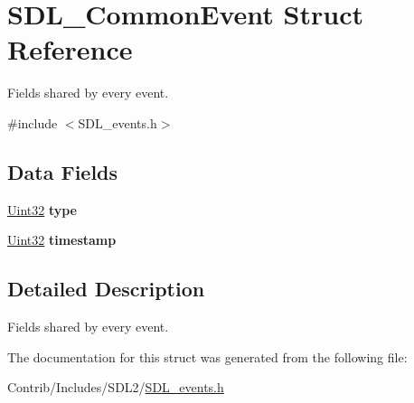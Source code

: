 \hypertarget{struct_s_d_l___common_event}{}\section{S\+D\+L\+\_\+\+Common\+Event Struct Reference}
\label{struct_s_d_l___common_event}


Fields shared by every event.  




{\ttfamily \#include $<$S\+D\+L\+\_\+events.\+h$>$}

\subsection*{Data Fields}
\begin{DoxyCompactItemize}
\item 
\hyperlink{_s_d_l__stdinc_8h_add440eff171ea5f55cb00c4a9ab8672d}{Uint32} {\bfseries type}\hypertarget{struct_s_d_l___common_event_aa40a9b05c3154032b9f2d7220e9f08dc}{}\label{struct_s_d_l___common_event_aa40a9b05c3154032b9f2d7220e9f08dc}

\item 
\hyperlink{_s_d_l__stdinc_8h_add440eff171ea5f55cb00c4a9ab8672d}{Uint32} {\bfseries timestamp}\hypertarget{struct_s_d_l___common_event_abf1ed7edeab81db9c05d899836a44a2f}{}\label{struct_s_d_l___common_event_abf1ed7edeab81db9c05d899836a44a2f}

\end{DoxyCompactItemize}


\subsection{Detailed Description}
Fields shared by every event. 

The documentation for this struct was generated from the following file\+:\begin{DoxyCompactItemize}
\item 
Contrib/\+Includes/\+S\+D\+L2/\hyperlink{_s_d_l__events_8h}{S\+D\+L\+\_\+events.\+h}\end{DoxyCompactItemize}
